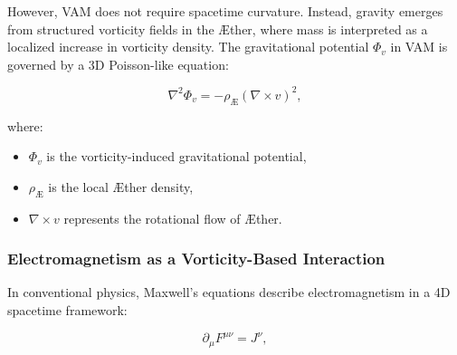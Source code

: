    However, VAM does not require spacetime curvature. Instead, gravity emerges from structured vorticity fields in the Æther, where mass is interpreted as a localized increase in vorticity density. The gravitational potential \( \Phi_v \) in VAM is governed by a 3D Poisson-like equation:

    \begin{equation*}
        \nabla^2 \Phi_v = -\rho_{\text{Æ}} (\nabla \times v)^2,
    \end{equation*}

    where:
    \begin{itemize}
        \item \( \Phi_v \) is the vorticity-induced gravitational potential,
        \item \( \rho_{\text{Æ}} \) is the local Æther density,
        \item \( \nabla \times v \) represents the rotational flow of Æther.
    \end{itemize}


\begin{table}[h]
    \centering
    \caption{Comparison between General Relativity and VAM}
    \label{tab:GR_vs_VAM}
\end{table}


    \subsubsection*{Electromagnetism as a Vorticity-Based Interaction}

    In conventional physics, Maxwell’s equations describe electromagnetism in a 4D spacetime framework:

    \begin{equation*}
        \partial_\mu F^{\mu\nu} = J^\nu,
    \end{equation*}

